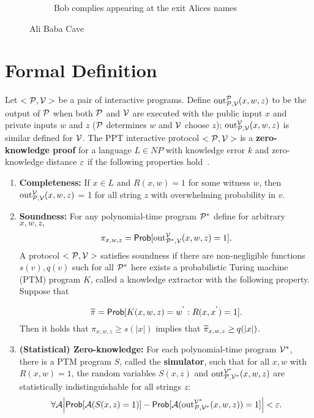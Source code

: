 \begin{figure}[t!]
\begin{subfigure}[t]{0.30\textwidth}
{\begin{tikzpicture}[scale=1]
      \end{tikzpicture}
    }
    \caption{Bob complies appearing at the exit Alices names}
    \label{fig:zkp:alibaba:c}
  \end{subfigure}
  \caption{Ali Baba Cave}
  \label{fig:zkp:alibaba}
\end{figure}

\section{Formal Definition}
\label{zkp:definition}

Let $<\calp, \calv>$ be a pair of interactive programs. Define $\text{out}^{\calp}_{\calp, \calv}(x,w,z)$
to be the output of $\calp$ when both $\calp$ and $\calv$ are executed with the public input $x$ and private
inputs $w$ and $z$ ($\calp$ determines $w$ and $\calv$ choose $z$); $\text{out}^{\calv}_{\calp, \calv}(x,w,z)$
is similar defined for $\calv$. The PPT interactive protocol $<\calp, \calv>$ is a \textbf{zero-knowledge proof}
for a language $L \in NP$ with knowledge error $k$ and zero-knowledge distance $\e$ if the following
properties hold~\cite{kiagias:crypto}.

\begin{enumerate}
  \item \textbf{Completeness:} If $x \in L$ and $R(x,w) = 1$ for some witness $w$, then $\text{out}^{\calv}_{\calp, \calv}(x,w,z)$ = 1
    for all string $z$ with overwhelming probability in $v$.
  \item \textbf{Soundness:} For any polynomial-time program $\calp^{*}$ define for arbitrary $x,w,z,$
    \begin{equation*}
      \pi_{x,w,z} = \Prob[\text{out}^{\calv}_{\calp^{*}, \calv}(x,w,z) = 1].
    \end{equation*}
    A protocol $<\calp, \calv>$ satisfies soundness if there are non-negligible functions $s(v), q(v)$ such for all $\calp^{*}$ here exists a probabilistic
    Turing machine (PTM) program $K$, called a knowledge extractor with the following property. Suppose that

    \begin{equation*}
      \widetilde{\pi} = \Prob[K(x,w,z) = w^{'} : R(x, x^{'}) = 1].
    \end{equation*}
    Then it holds that $\pi_{x,w,z} \geq s(|x|)$ implies that $\widetilde{\pi}_{x,w,z} \geq q(\abs{x})$.

  \item \textbf{(Statistical) Zero-knowledge:} For each polynomial-time program $\calv^{*}$, there is a PTM program $S$, called the \textbf{simulator}, such that for all
    $x,w$ with $R(x,w) = 1$, the random variables $S(x,z)$ and $\text{out}^{\calv^{*}}_{\calp, \calv^{*}}(x,w,z)$ are statistically indistinguishable for all strings $z$:
    \begin{equation*}
      \forall \cala \abs[\Big]{\Prob[\cala(S(x,z) = 1)] - \Prob[\cala(\text{out}^{\calv^{*}}_{\calp, \calv^{*}}(x,w,z)) = 1]} < \e.
    \end{equation*}
\end{enumerate}

